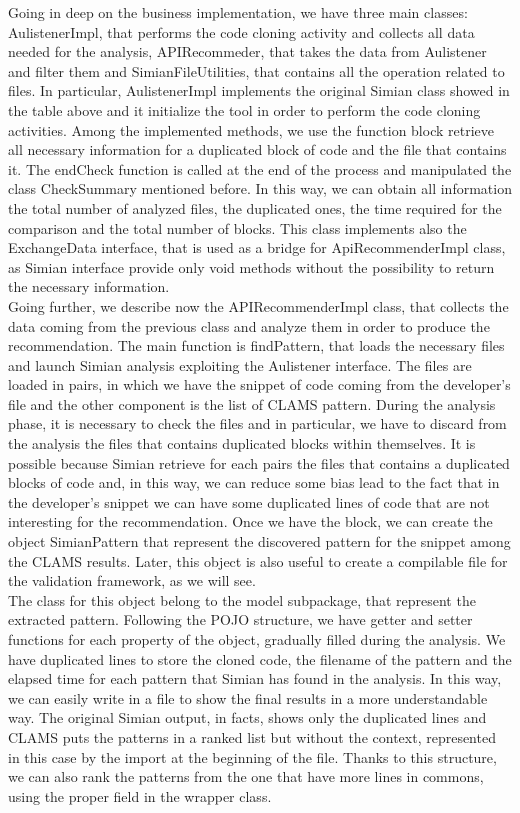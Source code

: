 Going in deep on the business implementation, we have three main classes: AulistenerImpl, that performs the code cloning activity and collects all data needed for the analysis, APIRecommeder, that takes the data from Aulistener and filter them and SimianFileUtilities, that contains all the operation related to files. In particular, AulistenerImpl implements the original Simian class showed in the table above and it initialize the tool in order to perform the code cloning activities. Among the implemented methods, we use the function block retrieve all necessary information for a duplicated block of code and the file that contains it. The endCheck function is called at the end of the process and manipulated the class CheckSummary mentioned before. In this way, we can obtain all information the total number of analyzed files, the duplicated ones, the time required for the comparison and the total number of blocks. This class implements also the ExchangeData interface, that is used as a bridge for ApiRecommenderImpl class, as Simian interface provide only void methods without the possibility to return the necessary information.\\
Going further, we describe now the APIRecommenderImpl class, that collects the data coming from the previous class and analyze them in order to produce the recommendation. The main function is findPattern, that loads the necessary files and launch Simian analysis exploiting the Aulistener interface. The files are loaded in pairs, in which we have the snippet of code coming from the developer's file and the other component is the list of CLAMS pattern. During the analysis phase, it is necessary to check the files and in particular, we have to discard from the analysis the files that contains duplicated blocks within themselves. It is possible because Simian retrieve for each pairs the files that contains a duplicated blocks of code and, in this way, we can reduce some bias lead to the fact that in the developer's snippet we can have some duplicated lines of code that are not interesting for the recommendation. Once we have the block, we can create the object SimianPattern that represent the discovered pattern for the snippet among the CLAMS results. Later, this object is also useful to create a compilable file for the validation framework, as we will see.\\
The class for this object belong to the model subpackage, that represent the extracted pattern. Following the POJO structure, we have getter and setter functions for each property of the object, gradually filled during the analysis. We have duplicated lines to store the cloned code, the filename of the pattern and the elapsed time for each pattern that Simian has found in the analysis. In this way, we can easily write in a file to show the final results in a more understandable way. The original Simian output, in facts, shows only the duplicated lines and CLAMS puts the patterns in a ranked list but without the context, represented in this case by the import at the beginning of the file. Thanks to this structure, we can also rank the patterns from the one that have more lines in commons, using the proper field in the wrapper class.\\
